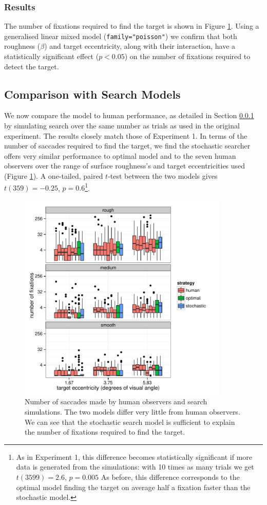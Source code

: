 \documentclass[preprint, authoryear]{elsarticle} %
\begin{document}
\subsubsection{Results}
\label{sec:SearchPerf}
The number of fixations required to find the target is shown in Figure \ref{fig:numFixHumanModelClarke2009}. Using a generalised linear mixed model  (\texttt{family="poisson"}) we confirm that both roughness ($\beta$) and target eccentricity, along with their interaction, have a statistically significant effect ($p<0.05$) on the number of fixations required to detect the target. 

\subsection{Comparison with Search Models}

We now compare the model to human performance, as detailed in Section \ref{sec:SearchPerf} by simulating search over the same number as trials as used in the original experiment. The results closely match those of Experiment 1. In terms of the number of saccades required to find the target, we find the stochastic searcher offers very similar performance to optimal model and to the seven human observers over the range of surface roughness's and target eccentricities used (Figure  \ref{fig:numFixHumanModelClarke2009}). A one-tailed, paired $t$-test between the two models gives $t(359)=-0.25$, $p=0.6$\footnote{As in Experiment 1, this difference becomes statistically significant if more data is generated from the simulations: with 10 times as many trials we get $t(3599)=2.6$, $p=0.005$ As before, this difference corresponds to the optimal model finding the target on average half a fixation faster than the stochastic model.}. 

\begin{figure}
	\centering
	\includegraphics[width=10cm]{fig/numFixHumanModelclarke2009.pdf}
	\caption{Number of saccades made by human observers and search simulations. The two models differ very little from human observers. We can see that the stochastic search model is sufficient to explain the number of fixations required to find the target.} 
	\label{fig:numFixHumanModelClarke2009}
\end{figure}
\end{document}
